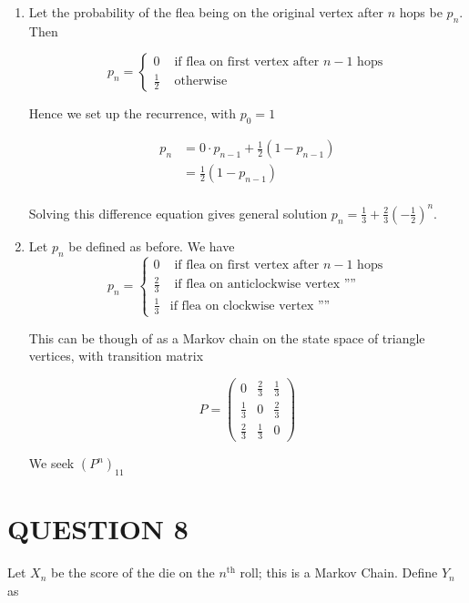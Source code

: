 \documentclass[a4paper]{article}
\begin{document}
\begin{enumerate}
	\item Let the probability of the flea being on the original vertex after $ n $ hops be $ p_{n} $. Then

\[ p_{n} = \begin{cases} 0  & \text{ if flea on first vertex after } n-1 \text{ hops}  \\ \frac{1}{2} & \text{ otherwise } \end{cases} \]

Hence we set up the recurrence, with $ p_{0} = 1 $

\begin{align*}
p_{n} & = 0 \cdot p_{n-1} + \frac{1}{2} (1 - p_{n-1})  \\
& = \frac{1}{2} (1 - p_{n-1}) \\
\end{align*}

Solving this difference equation gives general solution $ p_{n} = \frac{1}{3} + \frac{2}{3}\left( - \frac{1}{2} \right)^{n}   $.

\item Let $ p_{n} $ be defined as before. We have \[ p_{n} = \begin{cases} 0  & \text{ if flea on first vertex after } n-1 \text{ hops}  \\ \frac{2}{3} & \text{ if flea on anticlockwise vertex '''' } \\
\frac{1}{3} & \text{if flea on clockwise vertex '''' } \end{cases} \]

This can be though of as a Markov chain on the state space of triangle vertices, with transition matrix

\[ P = \begin{pmatrix}
0 & \frac{2}{3} & \frac{1}{3} \\
\frac{1}{3} & 0 & \frac{2}{3} \\
\frac{2}{3} & \frac{1}{3} & 0
\end{pmatrix} \]
	
We seek $ (P^{n})_{11} $	


\end{enumerate}





\section{QUESTION 8}

Let $ X_{n} $ be the score of the die on the $ n^{\text{th}} $ roll; this is a Markov Chain. Define $ Y_{n} $ as
\end{document}
